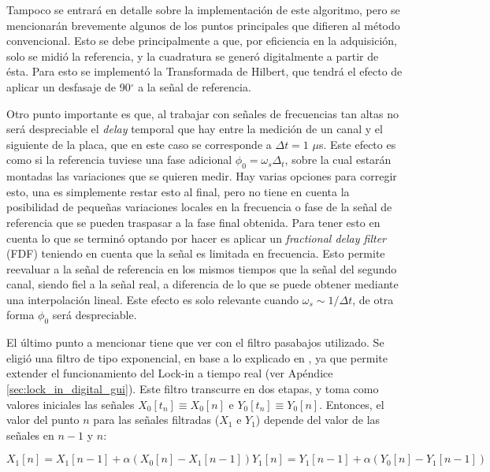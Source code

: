 Tampoco se entrará en detalle sobre la implementación de este algoritmo, pero se mencionarán brevemente algunos de los puntos principales que difieren al método convencional. Esto se debe principalmente a que, por eficiencia en la adquisición, solo se midió la referencia, y la cuadratura se generó digitalmente a partir de ésta. Para esto se implementó la Transformada de Hilbert, que tendrá el efecto de aplicar un desfasaje de 90$^\circ$ a la señal de referencia.  %



Otro punto importante es que, al trabajar con señales de frecuencias tan altas no será despreciable el \textit{delay} temporal que hay entre la medición de un canal y el siguiente de la placa, que en este caso se corresponde a $\Delta t=1$ $\mu$s. Este efecto es como si la referencia tuviese una fase adicional $\phi_0=\omega_s\Delta_t$, sobre la cual estarán montadas las variaciones que se quieren medir. Hay varias opciones para corregir esto, una es simplemente restar esto al final, pero no tiene en cuenta la posibilidad de pequeñas variaciones locales en la frecuencia o fase de la señal de referencia que se pueden traspasar a la fase final obtenida. Para tener esto en cuenta lo que se terminó optando por hacer es aplicar un \textit{fractional delay filter} (FDF) teniendo en cuenta que la señal es limitada en frecuencia. Esto permite reevaluar a la señal de referencia en los mismos tiempos que la señal del segundo canal, siendo fiel a la señal real, a diferencia de lo que se puede obtener mediante una interpolación lineal. Este efecto es solo relevante cuando $\omega_s\sim1/\Delta t$, de otra forma $\phi_0$ será despreciable. 

El último punto a mencionar tiene que ver con el filtro pasabajos utilizado. Se eligió una filtro de tipo exponencial, en base a lo explicado en \cite{harvieOLIAOpensourceDigital2023}, ya que permite extender el funcionamiento del Lock-in a tiempo real (ver Apéndice \ref{sec:lock_in_digital_gui}). Este filtro transcurre en dos etapas, y toma como valores iniciales las señales $X_0[t_n]\equiv X_0[n]$ e $Y_0[t_n]\equiv Y_0[n]$. Entonces, el valor del punto $n$ para las señales filtradas ($X_1$ e $Y_1$) depende del valor de las señales en $n-1$ y $n$: 

\begin{subequations} 
	\begin{equation}
		X_1[n] = X_1[n-1] + \alpha(X_0[n]-X_1[n-1]) 		
	\end{equation}
	\begin{equation}
		Y_1[n] = Y_1[n-1] + \alpha(Y_0[n]-Y_1[n-1]) 
	\end{equation}
\end{subequations}


